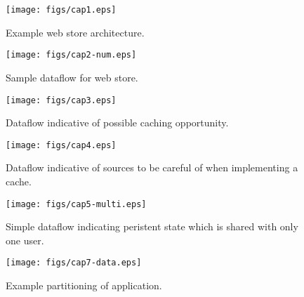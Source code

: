 \documentclass[msc,oneside]{ubcthesis}
\begin{document}
\begin{figure}[ht]
  \begin{center}
    \texttt{[image: figs/cap1.eps]}
    \caption[Example web store architecture.]{\label{fig:cap1} Example web store architecture.}
  \end{center}
\end{figure}

\begin{figure}[ht]
  \begin{center}
    \texttt{[image: figs/cap2-num.eps]}
    \caption[Sample dataflow for web store.]{\label{fig:cap2} Sample dataflow for web store.}
  \end{center}
\end{figure}

\begin{figure}[ht]
  \begin{center}
    \texttt{[image: figs/cap3.eps]}
    \caption[Dataflow indicative of possible caching opportunity.]{\label{fig:cap3} Dataflow indicative of possible caching opportunity.}
  \end{center}
\end{figure}

\begin{figure}[ht]
  \begin{center}
    \texttt{[image: figs/cap4.eps]}
    \caption[Dataflow indicative of sources to be careful of when implementing a cache.]{\label{fig:cap4} Dataflow indicative of sources to be careful of when implementing a cache.}
  \end{center}
\end{figure}

\begin{figure}[ht]
  \begin{center}
    \texttt{[image: figs/cap5-multi.eps]}
    \caption[Simple dataflow indicating peristent state which is shared with only one user.]{\label{fig:cap5} Simple dataflow indicating peristent state which is shared with only one user.}
  \end{center}
\end{figure}	

\begin{figure}[ht]
  \begin{center}
    \texttt{[image: figs/cap7-data.eps]}
    \caption[Example partitioning of application.]{\label{fig:cap7} Example partitioning of application.}
  \end{center}
\end{figure}
	
\end{document}

